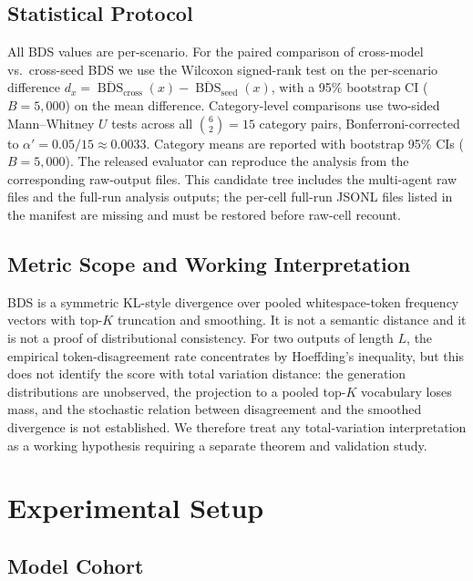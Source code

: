 \documentclass[11pt]{article}
\DeclareMathOperator{\BDS}{BDS}
\begin{document}
\subsection{Statistical Protocol}

All BDS values are per-scenario. For the paired comparison of cross-model
vs.\ cross-seed BDS we use the Wilcoxon signed-rank test on the
per-scenario difference $d_x = \overline{\BDS}_{\text{cross}}(x) - \overline{\BDS}_{\text{seed}}(x)$,
with a 95\% bootstrap CI ($B = 5{,}000$) on the mean difference.
Category-level comparisons use two-sided Mann--Whitney $U$ tests across
all $\binom{6}{2} = 15$ category pairs, Bonferroni-corrected to
$\alpha' = 0.05/15 \approx 0.0033$. Category means are reported with
bootstrap 95\% CIs ($B = 5{,}000$). The released evaluator can reproduce the
analysis from the corresponding raw-output files. This candidate tree
includes the multi-agent raw files and the full-run analysis outputs; the
per-cell full-run JSONL files listed in the manifest are missing and must be
restored before raw-cell recount.

\subsection{Metric Scope and Working Interpretation}

BDS is a symmetric KL-style divergence over pooled whitespace-token
frequency vectors with top-$K$ truncation and smoothing. It is not a
semantic distance and it is not a proof of distributional consistency.
For two outputs of length $L$, the empirical token-disagreement rate
concentrates by Hoeffding's inequality, but this does not identify the
score with total variation distance: the generation distributions are
unobserved, the projection to a pooled top-$K$ vocabulary loses mass,
and the stochastic relation between disagreement and the smoothed
divergence is not established. We therefore treat any total-variation
interpretation as a working hypothesis requiring a separate theorem and
validation study.

\section{Experimental Setup}
\label{sec:setup}

\subsection{Model Cohort}
\end{document}
